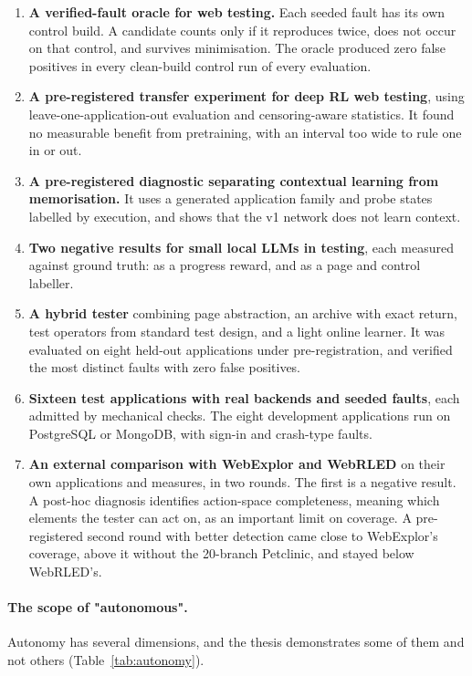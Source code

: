 \begin{enumerate}
  \item \textbf{A verified-fault oracle for web testing.} Each seeded fault has its own
        control build. A candidate counts only if it reproduces twice, does not occur on
        that control, and survives minimisation. The oracle produced zero false positives in
        every clean-build control run of every evaluation.
  \item \textbf{A pre-registered transfer experiment for deep RL web testing}, using
        leave-one-application-out evaluation and censoring-aware statistics. It found no
        measurable benefit from pretraining, with an interval too wide to rule one in or
        out.
  \item \textbf{A pre-registered diagnostic separating contextual learning from
        memorisation.} It uses a generated application family and probe states labelled by
        execution, and shows that the v1 network does not learn context.
  \item \textbf{Two negative results for small local LLMs in testing}, each measured
        against ground truth: as a progress reward, and as a page and control labeller.
  \item \textbf{A hybrid tester} combining page abstraction, an archive with exact return,
        test operators from standard test design, and a light online learner. It was
        evaluated on eight held-out applications under pre-registration, and verified the
        most distinct faults with zero false positives.
  \item \textbf{Sixteen test applications with real backends and seeded faults}, each
        admitted by mechanical checks. The eight development applications run on PostgreSQL
        or MongoDB, with sign-in and crash-type faults.
  \item \textbf{An external comparison with WebExplor and WebRLED} on their own
        applications and measures, in two rounds. The first is a negative result. A post-hoc
        diagnosis identifies action-space completeness, meaning which elements the tester
        can act on, as an important limit on coverage. A pre-registered second round with
        better detection came close to WebExplor's coverage, above it without the
        20-branch Petclinic, and stayed below WebRLED's.
\end{enumerate}

\paragraph{The scope of "autonomous".} Autonomy has several dimensions, and the thesis
demonstrates some of them and not others (Table~\ref{tab:autonomy}).

